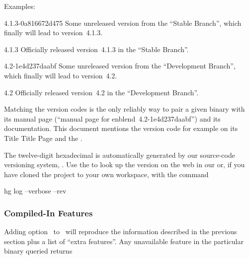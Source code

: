 \noindent Examples:

\begin{codelist}
\item[4.1.3-0a816672d475]\itemend
  Some unreleased version from the ``Stable Branch'', which finally will lead to version~4.1.3.

\item[4.1.3]\itemend
  Officially released version~4.1.3 in the ``Stable Branch''.

\item[4.2-1e4d237daabf]\itemend
  Some unreleased version from the ``Development Branch'', which finally will lead to
  version~4.2.

\item[4.2]\itemend
  Officially released version~4.2 in the ``Development Branch''.
\end{codelist}

Matching the version codes is the only reliably way to pair a given binary with its manual page
(``manual page for enblend~4.2-1e4d237daabf'') and its documentation.  This document mentions
the version code for example on its
\ifhevea
Title
\else
Title Page
\fi
and the .

%
%
%
The twelve-digit hexadecimal  is automatically generated by our source-code
versioning system, .  Use the
 to look up the version on the web in our  or, if you have cloned the project to your own workspace, with the
command
\begin{literal}
  hg log --verbose --rev 
\end{literal}


\subsubsection[Compiled-In Features]{\label{sec:compiled-in-features}%
  Compiled-In Features}

Adding option~ to~ will reproduce the information described
in the previous section plus a list of ``extra features''.  Any unavailable feature in the
particular binary queried returns


